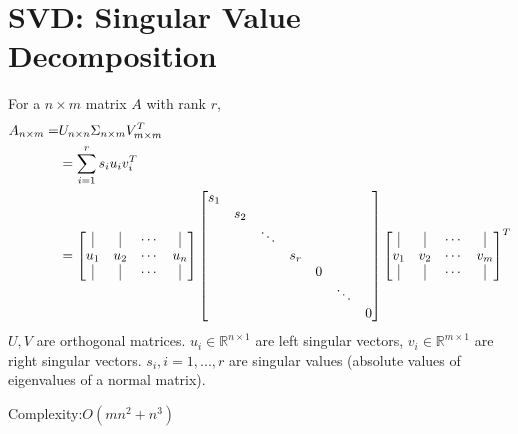 \documentclass[11pt]{elegantbook}
\begin{document}
\section{SVD: Singular Value Decomposition}
For a $n\times m$ matrix $A$ with rank $r$,
\begin{equation}
    \begin{aligned}
        A_{n\times m}=&U_{n\times n}\Sigma_{n\times m}V^T_{m\times m}\\
        &=\sum_{i=1}^rs_iu_iv_i^T\\
        &=\begin{bmatrix}
            \vline&\vline&\cdots&\vline\\
            u_1&u_2&\cdots&u_n\\
            \vline&\vline&\cdots&\vline
        \end{bmatrix}\begin{bmatrix}
            s_1&&&&&&\\
            &s_2&&&&&\\
            &&\ddots&&&&\\
            &&&s_r&&&\\
            &&&&0&&\\
            &&&&&\ddots&\\
            &&&&&&0
        \end{bmatrix}\begin{bmatrix}
            \vline&\vline&\cdots&\vline\\
            v_1&v_2&\cdots&v_m\\
            \vline&\vline&\cdots&\vline
        \end{bmatrix}^T
    \end{aligned}
    \nonumber
\end{equation}
$U,V$ are orthogonal matrices. $u_i\in \mathbb{R}^{n\times 1}$ are left singular vectors, $v_i\in \mathbb{R}^{m\times 1}$ are right singular vectors. $s_i,i=1,...,r$ are singular values (absolute values of eigenvalues of a normal matrix).

Complexity:$O(mn^2+n^3)$
\end{document}
